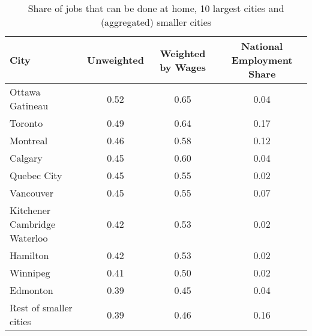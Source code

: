 \begin{table}[ht]
\centering
\caption{Share of jobs that can be done at home, 10 largest cities and (aggregated) smaller cities} 
\label{tab:table_cities_largest}
\begin{tabular}{lccc}
  \hline
City & Unweighted & Weighted by Wages & National Employment Share \\ 
  \hline
Ottawa   Gatineau & 0.52 & 0.65 & 0.04 \\ 
  Toronto & 0.49 & 0.64 & 0.17 \\ 
  Montreal & 0.46 & 0.58 & 0.12 \\ 
  Calgary & 0.45 & 0.60 & 0.04 \\ 
  Quebec City & 0.45 & 0.55 & 0.02 \\ 
  Vancouver & 0.45 & 0.55 & 0.07 \\ 
  Kitchener   Cambridge   Waterloo & 0.42 & 0.53 & 0.02 \\ 
  Hamilton & 0.42 & 0.53 & 0.02 \\ 
  Winnipeg & 0.41 & 0.50 & 0.02 \\ 
  Edmonton & 0.39 & 0.45 & 0.04 \\ 
  Rest of smaller cities & 0.39 & 0.46 & 0.16 \\ 
   \hline
\end{tabular}
\end{table}
